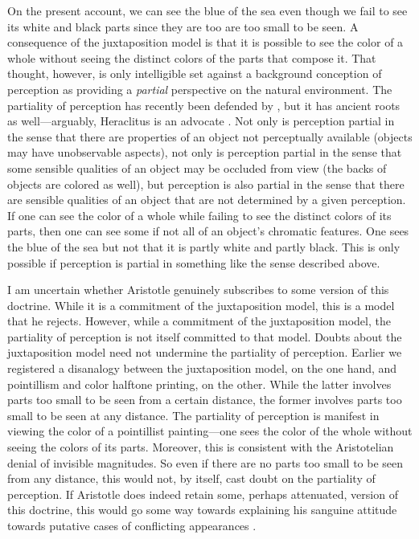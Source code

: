 On the present account, we can see the blue of the sea even though we fail to see its white and black parts since they are too are too small to be seen. A consequence of the juxtaposition model is that it is possible to see the color of a whole without seeing the distinct colors of the parts that compose it. That thought, however, is only intelligible set against a background conception of perception as providing a \emph{partial} perspective on the natural environment. The partiality of perception has recently been defended by \citet{Hilbert:1987jq}, but it has ancient roots as well---arguably, Heraclitus is an advocate \citep[see][]{Burnyeat:1979mv,Kalderon:2006tg}. Not only is perception partial in the sense that there are properties of an object not perceptually available (objects may have unobservable aspects), not only is perception partial in the sense that some sensible qualities of an object may be occluded from view (the backs of objects are colored as well), but perception is also partial in the sense that there are sensible qualities of an object that are not determined by a given perception. If one can see the color of a whole while failing to see the distinct colors of its parts, then one can see some if not all of an object's chromatic features. One sees the blue of the sea but not that it is partly white and partly black. This is only possible if perception is partial in something like the sense described above.

I am uncertain whether Aristotle genuinely subscribes to some version of this doctrine. While it is a commitment of the juxtaposition model, this is a model that he rejects. However, while a commitment of the juxtaposition model, the partiality of perception is not itself committed to that model. Doubts about the juxtaposition model need not undermine the partiality of perception. Earlier we registered a disanalogy between the juxtaposition model, on the one hand, and pointillism and color halftone printing, on the other. While the latter involves parts too small to be seen from a certain distance, the former involves parts too small to be seen at any distance. The partiality of perception is manifest in viewing the color of a pointillist painting---one sees the color of the whole without seeing the colors of its parts. Moreover, this is consistent with the Aristotelian denial of invisible magnitudes. So even if there are no parts too small to be seen from any distance, this would not, by itself, cast doubt on the partiality of perception. If Aristotle does indeed retain some, perhaps attenuated, version of this doctrine, this would go some way towards explaining his sanguine attitude towards putative cases of conflicting appearances \citep[on how the partiality of perception can help dissipate some appearances of conflict see][]{Kalderon:2006tg}.

